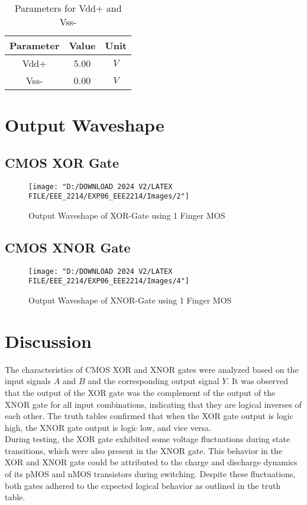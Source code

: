 \documentclass[a4paper,12pt]{article}
\begin{document}
	\begin{table}[H]
		\centering
		\caption{Parameters for Vdd+ and Vss- }
		\begin{tabular}{|c|c|c|}
			\hline
			\textbf{Parameter} & \textbf{Value} & \textbf{Unit} \\ \hline
			Vdd+               & 5.00           & $V $            \\ \hline
			Vss-               & 0.00           & $V$             \\ \hline
		\end{tabular}
		
	\end{table}
	
	\newpage
	\section{Output Waveshape }
	\subsection{CMOS XOR Gate}
	\begin{figure}[H]
		\centering
		\texttt{[image: "D:/DOWNLOAD 2024 V2/LATEX FILE/EEE\_2214/EXP06\_EEE2214/Images/2"]}
		\caption{Output Waveshape of XOR-Gate using 1 Finger MOS}
		\label{fig:1}
	\end{figure}
	\subsection{CMOS XNOR Gate}
	\begin{figure}[H]
		\centering
		\texttt{[image: "D:/DOWNLOAD 2024 V2/LATEX FILE/EEE\_2214/EXP06\_EEE2214/Images/4"]}
		\caption{Output Waveshape of XNOR-Gate using 1 Finger MOS}
		\label{fig:1}
	\end{figure}
	\section{Discussion}
The characteristics of  CMOS XOR and XNOR gates were analyzed based on the input signals \(A\) and \(B\) and the corresponding output signal \(Y\). It was observed that the output of the XOR gate was the complement of the output of the XNOR gate for all input combinations, indicating that they are logical inverses of each other. The truth tables confirmed that when the XOR gate output is logic high, the XNOR gate output is logic low, and vice versa.\\
During testing, the XOR gate exhibited some voltage fluctuations during state transitions, which were also present in the XNOR gate. This behavior in the XOR and XNOR gate could be attributed to the charge and discharge dynamics of its pMOS and nMOS transistors during switching. Despite these fluctuations, both gates adhered to the expected logical behavior as outlined in the truth table.
	
	
\end{document}
